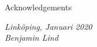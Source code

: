 \begin{acknowledgments}
Acknowledgements

  \addvspace{1em}
  \begin{flushright}
    \textit{%
      Linköping, Januari 2020\\
      Benjamin Lind%
    }
  \end{flushright}
\end{acknowledgments}
